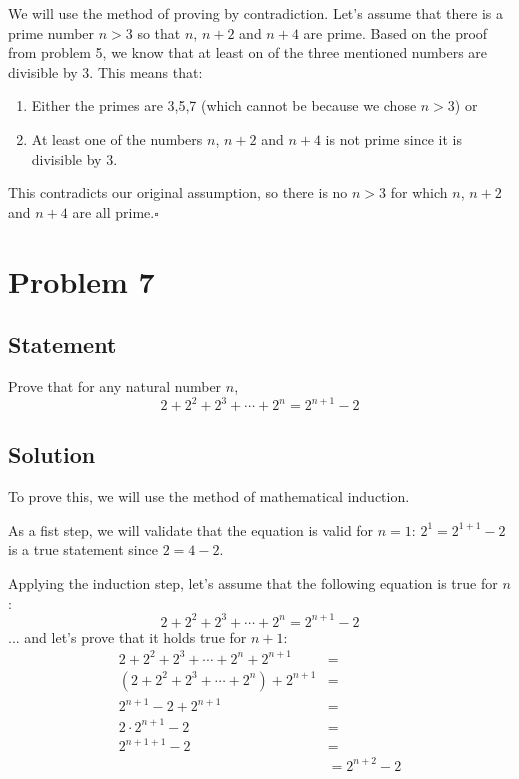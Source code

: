 \documentclass[12pt,letter]{memoir}
\begin{document}
We will use the method of proving by contradiction. Let's assume that there is a prime number $n>3$ so that $n$, $n+2$ and $n+4$ are prime. Based on the proof from problem 5, we know that at least on of the three mentioned numbers are divisible by 3. This means that:
\begin{enumerate}
\item Either the primes are 3,5,7 (which cannot be because we chose $n>3$) or
\item At least one of the numbers $n$, $n+2$ and $n+4$ is not prime since it is divisible by 3.
\end{enumerate}
This contradicts our original assumption, so there is no $n>3$ for which $n$, $n+2$ and $n+4$ are all prime.$\square$

\chapter{Problem 7}
\section*{Statement}
Prove that for any natural number $n$,
\begin{equation}
2 + 2^2 + 2^3 + \cdots + 2^n = 2^{n+1}-2
\end{equation}
\section*{Solution}
To prove this, we will use the method of mathematical induction.

As a fist step, we will validate that the equation is valid for $n=1$: $2^1=2^{1+1}-2$ is a true statement since $2=4-2$.

Applying the induction step, let's assume that the following equation is true for $n$:
\begin{equation}
2 + 2^2 + 2^3 + \cdots + 2^n = 2^{n+1}-2
\end{equation}
... and let's prove that it holds true for $n+1$:
\begin{equation}\label{inducepown}
\begin{split}
2 + 2^2 + 2^3 + \cdots + 2^n + 2^{n+1} & = \\
(2 + 2^2 + 2^3 + \cdots + 2^n) + 2^{n+1} & = \\
2^{n+1}-2+2^{n+1} & = \\
2 \cdot 2^{n+1}-2 & = \\
2^{n+1+1}-2 & = \\
& = 2^{n+2}-2
\end{split}
\end{equation}
\end{document}
